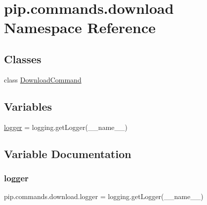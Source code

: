 \hypertarget{namespacepip_1_1commands_1_1download}{}\section{pip.\+commands.\+download Namespace Reference}
\label{namespacepip_1_1commands_1_1download}
\subsection*{Classes}
\begin{DoxyCompactItemize}
\item 
class \hyperlink{classpip_1_1commands_1_1download_1_1_download_command}{Download\+Command}
\end{DoxyCompactItemize}
\subsection*{Variables}
\begin{DoxyCompactItemize}
\item 
\hyperlink{namespacepip_1_1commands_1_1download_a26173dbb34cbba034d66bcf01b8e0c51}{logger} = logging.\+get\+Logger(\+\_\+\+\_\+name\+\_\+\+\_\+)
\end{DoxyCompactItemize}


\subsection{Variable Documentation}
\mbox{\label{namespacepip_1_1commands_1_1download_a26173dbb34cbba034d66bcf01b8e0c51}} 
\subsubsection{\texorpdfstring{logger}{logger}}
{\footnotesize\ttfamily pip.\+commands.\+download.\+logger = logging.\+get\+Logger(\+\_\+\+\_\+name\+\_\+\+\_\+)}

